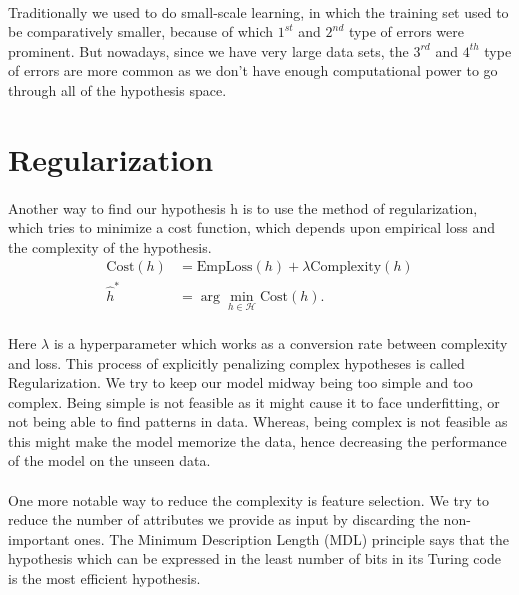 \documentclass{article}
\begin{document}
  \paragraph{}
    Traditionally we used to do small-scale learning, in which the training set used to be comparatively smaller, because of which $1^{st}$ and $2^{nd}$ type of errors were prominent. 
    But nowadays, since we have very large data sets, the $3^{rd}$ and $4^{th}$ type of errors are more common as we don't have enough computational power to go through all of the hypothesis space.
    

\section*{Regularization}
  \paragraph{}
  Another way to find our hypothesis h is to use the method of regularization, which tries to minimize a cost function, which depends upon empirical loss and the complexity of the hypothesis.
      \begin{align*}
        \text{Cost}(h) &= \text{EmpLoss}(h) + \lambda \text{Complexity}(h) \\
        \hat{h}^* &= \arg\min_{h \in \mathcal{H}} \text{Cost}(h).
      \end{align*}
    
  \paragraph{}
    Here $\lambda$ is a hyperparameter which works as a conversion rate between complexity and loss. 
    This process of explicitly penalizing complex hypotheses is called Regularization. 
    We try to keep our model midway being too simple and too complex. 
    Being simple is not feasible as it might cause it to face underfitting, or not being able to find patterns in data. 
    Whereas, being complex is not feasible as this might make the model memorize the data, hence decreasing the performance of the model on the unseen data.

  \paragraph{}
    One more notable way to reduce the complexity is feature selection. 
    We try to reduce the number of attributes we provide as input by discarding the non-important ones. 
    The Minimum Description Length (MDL) principle says that the hypothesis which can be expressed in the least number of bits in its Turing code is the most efficient hypothesis.
\end{document}
